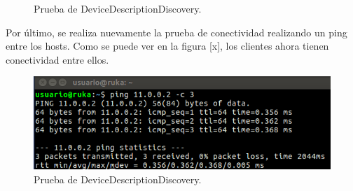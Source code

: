       \begin{figure}[H]
        \centering
        \caption{Prueba de DeviceDescriptionDiscovery.}
        \label{fig:test2}
      \end{figure}

      Por último, se realiza nuevamente la prueba de conectividad realizando un ping entre los hosts. Como se puede ver en la figura [x], los clientes ahora tienen conectividad entre ellos.

      \begin{figure}[H]
        \centering
        \includegraphics[scale=0.7]{Figures/test9_4.png}
        \caption{Prueba de DeviceDescriptionDiscovery.}
        \label{fig:test2}
      \end{figure}

